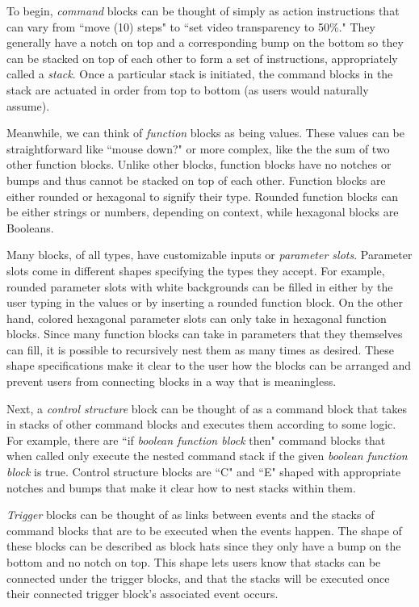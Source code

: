 To begin, \emph{command} blocks can be thought of simply as action instructions that can vary from ``move (10) steps" to ``set video transparency to 50\%." They generally have a notch on top and a corresponding bump on the bottom so they can be stacked on top of each other to form a set of instructions, appropriately called a \emph{stack}. Once a particular stack is initiated, the command blocks in the stack are actuated in order from top to bottom (as users would naturally assume).

Meanwhile, we can think of \emph{function} blocks as being values. These values can be straightforward like ``mouse down?" or more complex, like the the sum of two other function blocks. Unlike other blocks, function blocks have no notches or bumps and thus cannot be stacked on top of each other. Function blocks are either rounded or hexagonal to signify their type. Rounded function blocks can be either strings or numbers, depending on context, while hexagonal blocks are Booleans. 

Many blocks, of all types, have customizable inputs or \emph{parameter slots}. Parameter slots come in different shapes specifying the types they accept. For example, rounded parameter slots with white backgrounds can be filled in either by the user typing in the values or by inserting a rounded function block. On the other hand, colored hexagonal parameter slots can only take in hexagonal function blocks. Since many function blocks can take in parameters that they themselves can fill, it is possible to recursively nest them as many times as desired. These shape specifications make it clear to the user how the blocks can be arranged and prevent users from connecting blocks in a way that is meaningless.

Next, a \emph{control structure} block can be thought of as a command block that takes in stacks of other command blocks and executes them according to some logic. For example, there are ``if \emph{boolean function block} then" command blocks that when called only execute the nested command stack if the given \emph{boolean function block} is true. Control structure blocks are ``C" and ``E" shaped with appropriate notches and bumps that make it clear how to nest stacks within them.

\emph{Trigger} blocks can be thought of as links between events and the stacks of command blocks that are to be executed when the events happen. The shape of these blocks can be described as block hats since they only have a bump on the bottom and no notch on top. This shape lets users know that stacks can be connected under the trigger blocks, and that the stacks will be executed once their connected trigger block's associated event occurs.

